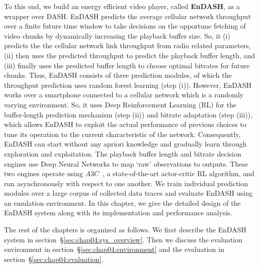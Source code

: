 To this end, we build an energy efficient video player, called {\bf EnDASH}, as a wrapper over \ac{DASH}. EnDASH predicts the average cellular network throughput over a finite future time window to take decisions on the opportune fetching of video chunks by dynamically increasing the playback buffer size. So, it (i) predicts the the cellular network link throughput from radio related parameters, (ii) then uses the predicted throughput to predict the playback buffer length, and (iii) finally uses the predicted buffer length to choose optimal bitrates for future chunks. Thus, EnDASH consists of three prediction modules, of which the throughput prediction uses random forest learning (step (i)). However, EnDASH works over a smartphone connected to a cellular network which is a randomly varying environment. So, it uses Deep Reinforcement Learning (RL) for the buffer-length prediction mechanism (step (ii)) and bitrate adaptation (step (iii)), which allows EnDASH to exploit the actual performance of previous choices to tune its operation to the current characteristic of the network.  Consequently, EnDASH can start without any apriori knowledge and gradually learn through exploration and exploitation.  The playback buffer length and bitrate decision engines use Deep Neural Networks to map `raw' observations to outputs. These two engines operate using $A3C$~\cite{mao2017neural}, a state-of-the-art actor-critic RL algorithm, and run asynchronously with respect to one another. We train individual prediction modules over a large corpus of collected data traces and evaluate EnDASH using an emulation environment. In this chapter, we give the detailed design of the EnDASH system along with its implementation and performance analysis. 

The rest of the chapters is organized as follows. We first describe the EnDASH system in section~\S\ref{sec:chap04:sys_overview}. Then we discuss the evaluation environment in section~\S\ref{sec:chap04:environment} and the evaluation in section~\S\ref{sec:chap04:evaluation}.


